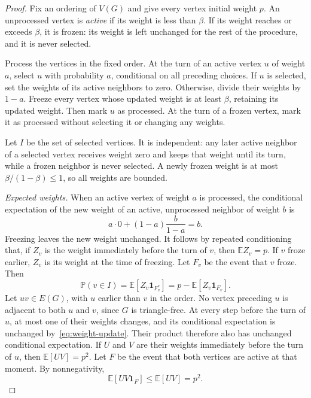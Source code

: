 \documentclass[11pt]{article}
\numberwithin{equation}{section}
\theoremstyle{remark}
\newcommand{\E}{\mathbb E}
\newcommand{\Pp}{\mathbb P}
\newcommand{\ind}{\mathbf 1}
\begin{document}
\begin{proof}
Fix an ordering of $V(G)$ and give every vertex initial weight $p$. An unprocessed vertex is \emph{active} if its weight is less than $\beta$. If its weight reaches or exceeds $\beta$, it is frozen: its weight is left unchanged for the rest of the procedure, and it is never selected.

Process the vertices in the fixed order. At the turn of an active vertex $u$ of weight $a$, select $u$ with probability $a$, conditional on all preceding choices. If $u$ is selected, set the weights of its active neighbors to zero. Otherwise, divide their weights by $1-a$. Freeze every vertex whose updated weight is at least $\beta$, retaining its updated weight. Then mark $u$ as processed. At the turn of a frozen vertex, mark it as processed without selecting it or changing any weights.

Let $I$ be the set of selected vertices. It is independent: any later active neighbor of a selected vertex receives weight zero and keeps that weight until its turn, while a frozen neighbor is never selected. A newly frozen weight is at most $\beta/(1-\beta)\le1$, so all weights are bounded.

\smallskip
\noindent\emph{Expected weights.}
When an active vertex of weight $a$ is processed, the conditional expectation of the new weight of an active, unprocessed neighbor of weight $b$ is
\begin{equation}\label{eq:weight-update}
 a\cdot0+(1-a)\frac{b}{1-a}=b.
\end{equation}
Freezing leaves the new weight unchanged. It follows by repeated conditioning that, if $Z_v$ is the weight immediately before the turn of $v$, then $\E Z_v=p$. If $v$ froze earlier, $Z_v$ is its weight at the time of freezing. Let $F_v$ be the event that $v$ froze. Then
\begin{equation}\label{eq:lost-weight}
 \Pp(v\in I)
 =\E[Z_v\ind_{F_v^c}]
 =p-\E[Z_v\ind_{F_v}].
\end{equation}
Let $uv\in E(G)$, with $u$ earlier than $v$ in the order. No vertex preceding $u$ is adjacent to both $u$ and $v$, since $G$ is triangle-free. At every step before the turn of $u$, at most one of their weights changes, and its conditional expectation is unchanged by~\eqref{eq:weight-update}. Their product therefore also has unchanged conditional expectation. If $U$ and $V$ are their weights immediately before the turn of $u$, then $\E[UV]=p^2$. Let $F$ be the event that both vertices are active at that moment. By nonnegativity,
\begin{equation}\label{eq:adjacent-product}
 \E[UV\ind_F]\le\E[UV]=p^2.
\end{equation}


\end{proof}
\end{document}
